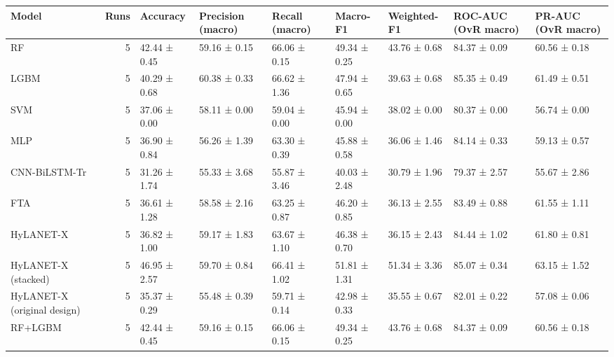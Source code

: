 \begin{tabular}{lrlllllll}
\toprule
Model & Runs & Accuracy & Precision (macro) & Recall (macro) & Macro-F1 & Weighted-F1 & ROC-AUC (OvR macro) & PR-AUC (OvR macro) \\
\midrule
RF & 5 & 42.44 ± 0.45 & 59.16 ± 0.15 & 66.06 ± 0.15 & 49.34 ± 0.25 & 43.76 ± 0.68 & 84.37 ± 0.09 & 60.56 ± 0.18 \\
LGBM & 5 & 40.29 ± 0.68 & 60.38 ± 0.33 & 66.62 ± 1.36 & 47.94 ± 0.65 & 39.63 ± 0.68 & 85.35 ± 0.49 & 61.49 ± 0.51 \\
SVM & 5 & 37.06 ± 0.00 & 58.11 ± 0.00 & 59.04 ± 0.00 & 45.94 ± 0.00 & 38.02 ± 0.00 & 80.37 ± 0.00 & 56.74 ± 0.00 \\
MLP & 5 & 36.90 ± 0.84 & 56.26 ± 1.39 & 63.30 ± 0.39 & 45.88 ± 0.58 & 36.06 ± 1.46 & 84.14 ± 0.33 & 59.13 ± 0.57 \\
CNN-BiLSTM-Tr & 5 & 31.26 ± 1.74 & 55.33 ± 3.68 & 55.87 ± 3.46 & 40.03 ± 2.48 & 30.79 ± 1.96 & 79.37 ± 2.57 & 55.67 ± 2.86 \\
FTA & 5 & 36.61 ± 1.28 & 58.58 ± 2.16 & 63.25 ± 0.87 & 46.20 ± 0.85 & 36.13 ± 2.55 & 83.49 ± 0.88 & 61.55 ± 1.11 \\
HyLANET-X & 5 & 36.82 ± 1.00 & 59.17 ± 1.83 & 63.67 ± 1.10 & 46.38 ± 0.70 & 36.15 ± 2.43 & 84.44 ± 1.02 & 61.80 ± 0.81 \\
HyLANET-X (stacked) & 5 & 46.95 ± 2.57 & 59.70 ± 0.84 & 66.41 ± 1.02 & 51.81 ± 1.31 & 51.34 ± 3.36 & 85.07 ± 0.34 & 63.15 ± 1.52 \\
HyLANET-X (original design) & 5 & 35.37 ± 0.29 & 55.48 ± 0.39 & 59.71 ± 0.14 & 42.98 ± 0.33 & 35.55 ± 0.67 & 82.01 ± 0.22 & 57.08 ± 0.06 \\
RF+LGBM & 5 & 42.44 ± 0.45 & 59.16 ± 0.15 & 66.06 ± 0.15 & 49.34 ± 0.25 & 43.76 ± 0.68 & 84.37 ± 0.09 & 60.56 ± 0.18 \\
\bottomrule
\end{tabular}
